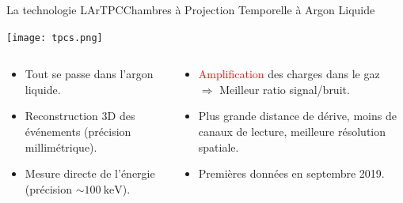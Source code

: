     \begin{frame}{La technologie LArTPC}{Chambres à Projection Temporelle à Argon Liquide}
       	\begin{scriptsize}
       			\texttt{[image: tpcs.png]}\\\vfill
       			\begin{columns}
       				\begin{column}{0.5\textwidth}
       					\begin{itemize}
       						\item Tout se passe dans l'argon liquide.
       						\item Reconstruction 3D des événements (précision millimétrique).
       						\item Mesure directe de l'énergie (précision $\sim\SI{100}{\kilo\electronvolt}$).
       					\end{itemize}
       				\end{column}\hfill
       				\begin{column}{0.5\textwidth}
       					\begin{itemize}
       						\item \textcolor{red}{Amplification} des charges dans le gaz\\$\Rightarrow$ Meilleur ratio signal/bruit.
       						\item Plus grande distance de dérive, moins de canaux de lecture, meilleure résolution spatiale.
       						\item Premières données en septembre 2019.
       					\end{itemize}
       				\end{column}
       			\end{columns}
       	\end{scriptsize}
    \end{frame}
            

